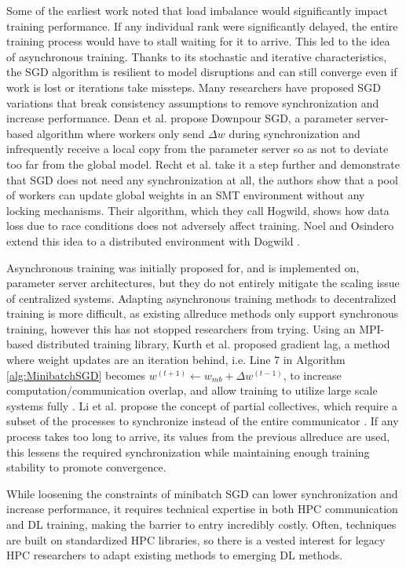 Some of the earliest work noted that load imbalance would significantly impact training performance. 
If any individual rank were significantly delayed, the entire training process would have to stall waiting for it to arrive.
This led to the idea of asynchronous training.
Thanks to its stochastic and iterative characteristics, the \gls{SGD} algorithm is resilient to model disruptions and can still converge even if work is lost or iterations take missteps.
Many researchers have proposed \gls{SGD} variations that break consistency assumptions to remove synchronization and increase performance.
Dean et al. \cite{Dean2012DistBelif} propose Downpour \gls{SGD}, a parameter server-based algorithm where workers only send $\Delta w$ during synchronization and infrequently receive a local copy from the parameter server so as not to deviate too far from the global model. 
Recht et al. \cite{Recht2011HogWild} take it a step further and demonstrate that \gls{SGD} does not need any synchronization at all, the authors show that a pool of workers can update global weights in an \gls{SMT} environment without any locking mechanisms.
Their algorithm, which they call Hogwild, shows how data loss due to race conditions does not adversely affect training.
Noel and Osindero extend this idea to a distributed environment with Dogwild \cite{Noel2014Dogwild}.

Asynchronous training was initially proposed for, and is implemented on, parameter server architectures, but they do not entirely mitigate the scaling issue of centralized systems.
Adapting asynchronous training methods to decentralized training is more difficult, as existing allreduce methods only support synchronous training, however this has not stopped researchers from trying.
Using an \gls{MPI}-based distributed training library, Kurth et al. proposed gradient lag, a method where weight updates are an iteration behind, i.e. Line 7 in Algorithm \ref{alg:MinibatchSGD} becomes $w^{(t+1)}\leftarrow w_{mb} + \Delta w^{(t-1)}$, to increase computation/communication overlap, and allow training to utilize large scale systems fully \cite{Kurth2018ExascaleDLClimate}.
Li et al. propose the concept of partial collectives, which require a subset of the processes to synchronize instead of the entire communicator \cite{Li2020DLPartialColl}.
If any process takes too long to arrive, its values from the previous allreduce are used, this lessens the required synchronization while maintaining enough training stability to promote convergence.

While loosening the constraints of minibatch \gls{SGD} can lower synchronization and increase performance, it requires technical expertise in both \gls{HPC} communication and \gls{DL} training, making the barrier to entry incredibly costly.
Often, techniques are built on standardized \gls{HPC} libraries, so there is a vested interest for legacy \gls{HPC} researchers to adapt existing methods to emerging \gls{DL} methods.


